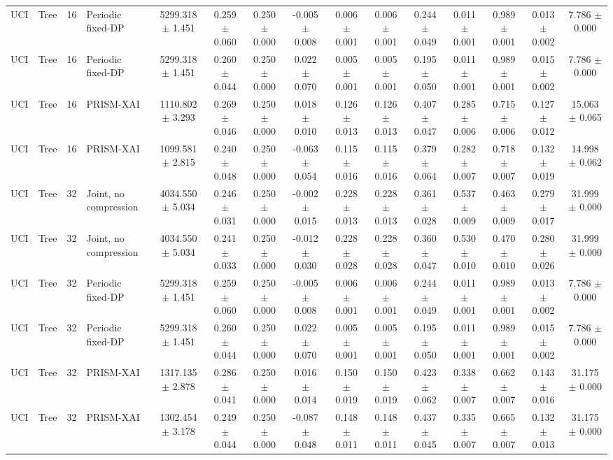 \begin{tabular}{llllccccccccccc}
UCI & Tree & 16 & Periodic fixed-DP & 5299.318 $\pm$ 1.451 & 0.259 $\pm$ 0.060 & 0.250 $\pm$ 0.000 & -0.005 $\pm$ 0.008 & 0.006 $\pm$ 0.001 & 0.006 $\pm$ 0.001 & 0.244 $\pm$ 0.049 & 0.011 $\pm$ 0.001 & 0.989 $\pm$ 0.001 & 0.013 $\pm$ 0.002 & 7.786 $\pm$ 0.000 \\
UCI & Tree & 16 & Periodic fixed-DP & 5299.318 $\pm$ 1.451 & 0.260 $\pm$ 0.044 & 0.250 $\pm$ 0.000 & 0.022 $\pm$ 0.070 & 0.005 $\pm$ 0.001 & 0.005 $\pm$ 0.001 & 0.195 $\pm$ 0.050 & 0.011 $\pm$ 0.001 & 0.989 $\pm$ 0.001 & 0.015 $\pm$ 0.002 & 7.786 $\pm$ 0.000 \\
UCI & Tree & 16 & PRISM-XAI & 1110.802 $\pm$ 3.293 & 0.269 $\pm$ 0.046 & 0.250 $\pm$ 0.000 & 0.018 $\pm$ 0.010 & 0.126 $\pm$ 0.013 & 0.126 $\pm$ 0.013 & 0.407 $\pm$ 0.047 & 0.285 $\pm$ 0.006 & 0.715 $\pm$ 0.006 & 0.127 $\pm$ 0.012 & 15.063 $\pm$ 0.065 \\
UCI & Tree & 16 & PRISM-XAI & 1099.581 $\pm$ 2.815 & 0.240 $\pm$ 0.048 & 0.250 $\pm$ 0.000 & -0.063 $\pm$ 0.054 & 0.115 $\pm$ 0.016 & 0.115 $\pm$ 0.016 & 0.379 $\pm$ 0.064 & 0.282 $\pm$ 0.007 & 0.718 $\pm$ 0.007 & 0.132 $\pm$ 0.019 & 14.998 $\pm$ 0.062 \\
UCI & Tree & 32 & Joint, no compression & 4034.550 $\pm$ 5.034 & 0.246 $\pm$ 0.031 & 0.250 $\pm$ 0.000 & -0.002 $\pm$ 0.015 & 0.228 $\pm$ 0.013 & 0.228 $\pm$ 0.013 & 0.361 $\pm$ 0.028 & 0.537 $\pm$ 0.009 & 0.463 $\pm$ 0.009 & 0.279 $\pm$ 0.017 & 31.999 $\pm$ 0.000 \\
UCI & Tree & 32 & Joint, no compression & 4034.550 $\pm$ 5.034 & 0.241 $\pm$ 0.033 & 0.250 $\pm$ 0.000 & -0.012 $\pm$ 0.030 & 0.228 $\pm$ 0.028 & 0.228 $\pm$ 0.028 & 0.360 $\pm$ 0.047 & 0.530 $\pm$ 0.010 & 0.470 $\pm$ 0.010 & 0.280 $\pm$ 0.026 & 31.999 $\pm$ 0.000 \\
UCI & Tree & 32 & Periodic fixed-DP & 5299.318 $\pm$ 1.451 & 0.259 $\pm$ 0.060 & 0.250 $\pm$ 0.000 & -0.005 $\pm$ 0.008 & 0.006 $\pm$ 0.001 & 0.006 $\pm$ 0.001 & 0.244 $\pm$ 0.049 & 0.011 $\pm$ 0.001 & 0.989 $\pm$ 0.001 & 0.013 $\pm$ 0.002 & 7.786 $\pm$ 0.000 \\
UCI & Tree & 32 & Periodic fixed-DP & 5299.318 $\pm$ 1.451 & 0.260 $\pm$ 0.044 & 0.250 $\pm$ 0.000 & 0.022 $\pm$ 0.070 & 0.005 $\pm$ 0.001 & 0.005 $\pm$ 0.001 & 0.195 $\pm$ 0.050 & 0.011 $\pm$ 0.001 & 0.989 $\pm$ 0.001 & 0.015 $\pm$ 0.002 & 7.786 $\pm$ 0.000 \\
UCI & Tree & 32 & PRISM-XAI & 1317.135 $\pm$ 2.878 & 0.286 $\pm$ 0.041 & 0.250 $\pm$ 0.000 & 0.016 $\pm$ 0.014 & 0.150 $\pm$ 0.019 & 0.150 $\pm$ 0.019 & 0.423 $\pm$ 0.062 & 0.338 $\pm$ 0.007 & 0.662 $\pm$ 0.007 & 0.143 $\pm$ 0.016 & 31.175 $\pm$ 0.000 \\
UCI & Tree & 32 & PRISM-XAI & 1302.454 $\pm$ 3.178 & 0.249 $\pm$ 0.044 & 0.250 $\pm$ 0.000 & -0.087 $\pm$ 0.048 & 0.148 $\pm$ 0.011 & 0.148 $\pm$ 0.011 & 0.437 $\pm$ 0.045 & 0.335 $\pm$ 0.007 & 0.665 $\pm$ 0.007 & 0.132 $\pm$ 0.013 & 31.175 $\pm$ 0.000 \\
\bottomrule
\end{tabular}
